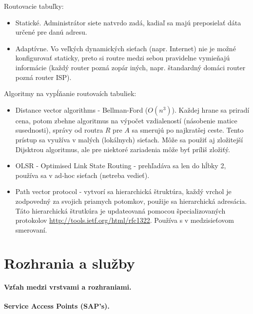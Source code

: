 Routovacie tabuľky:  
\begin{itemize}
\item Statické. Administrátor siete natvrdo zadá, kadiaľ sa majú preposielať dáta určené pre danú adresu.           
\item Adaptívne. Vo veľkých dynamických sieťach (napr. Internet) nie je možné konfigurovať staticky, preto si routre medzi sebou pravidelne vymieňajú informácie (každý router pozná zopár iných, napr. štandardný domáci router pozná router ISP). 
\end{itemize} 

Algoritmy na vypĺňanie routovaích tabuliek:
\begin{itemize}
\item Distance vector algorithms - Bellman-Ford ($O(n^3)$). Každej hrane sa priradí cena, potom zbehne algoritmus na výpočet vzdialeností (násobenie matice susednosti), správy od routra $R$ pre $A$ sa smerujú po najkratšej ceste. Tento prístup sa využíva v malých (lokálnych) sieťach. Môže sa použiť aj zložitejší Dijsktrou algoritmus, ale pre niektoré zariadenia môže byť príliš zložiťý.           
\item OLSR - Optimised Link State Routing - prehľadáva sa len do hĺbky 2, používa sa v ad-hoc sieťach (netreba vedieť). 
\item Path vector protocol - vytvorí sa hierarchická štruktúra, každý vrchol je zodpovedný za svojich priamych potomkov, použije sa hierarchická adresácia. Táto hierarchická štrutkúra je updateovaná pomocou špecializovaných protokolov \url{http://tools.ietf.org/html/rfc1322}. Používa s v medzisieťovom smerovaní.  
\end{itemize}
              
                                                         
\section{Rozhrania a služby}                     
\paragraph{Vzťah medzi vrstvami a rozhraniami.}  
\paragraph{Service Access Points (SAP's).}     
